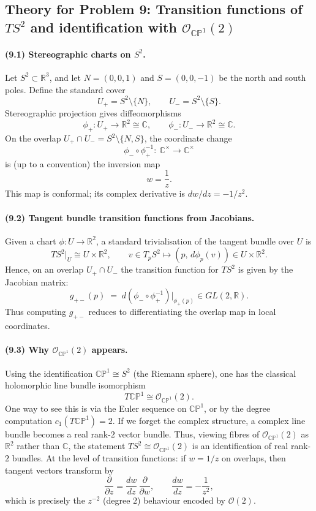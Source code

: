 \documentclass[12pt,a4paper]{article}
\theoremstyle{plain}
\theoremstyle{definition}      %
\begin{document}
\subsection*{Theory for Problem 9: Transition functions of $TS^2$ and identification with $\mathcal{O}_{\mathbb{CP}^1}(2)$}

\paragraph{(9.1) Stereographic charts on $S^2$.}
Let $S^2\subset \mathbb{R}^3$, and let $N=(0,0,1)$ and $S=(0,0,-1)$ be the north and south poles.
Define the standard cover
\[
U_+ = S^2\setminus\{N\},\qquad U_- = S^2\setminus\{S\}.
\]
Stereographic projection gives diffeomorphisms
\[
\phi_+:U_+\to \mathbb{R}^2 \cong \mathbb{C},\qquad
\phi_-:U_-\to \mathbb{R}^2 \cong \mathbb{C}.
\]
On the overlap $U_+\cap U_- = S^2\setminus\{N,S\}$, the coordinate change
\[
\phi_- \circ \phi_+^{-1}:\ \mathbb{C}^\times \longrightarrow \mathbb{C}^\times
\]
is (up to a convention) the inversion map
\[
w = \frac{1}{z}.
\]
This map is conformal; its complex derivative is $dw/dz = -1/z^2$.

\paragraph{(9.2) Tangent bundle transition functions from Jacobians.}
Given a chart $\phi:U\to \mathbb{R}^2$, a standard trivialisation of the tangent bundle over $U$ is
\[
TS^2|_U \cong U\times \mathbb{R}^2,\qquad
v\in T_pS^2 \mapsto (p,\, d\phi_p(v))\in U\times \mathbb{R}^2.
\]
Hence, on an overlap $U_+\cap U_-$ the transition function for $TS^2$ is given by the Jacobian matrix:
\[
g_{+-}(p)\;=\; d(\phi_- \circ \phi_+^{-1})\big|_{\phi_+(p)} \in GL(2,\mathbb{R}).
\]
Thus computing $g_{+-}$ reduces to differentiating the overlap map in local coordinates.

\paragraph{(9.3) Why $\mathcal{O}_{\mathbb{CP}^1}(2)$ appears.}
Using the identification $\mathbb{CP}^1\cong S^2$ (the Riemann sphere), one has the classical
holomorphic line bundle isomorphism
\[
T\mathbb{CP}^1 \cong \mathcal{O}_{\mathbb{CP}^1}(2).
\]
One way to see this is via the Euler sequence on $\mathbb{CP}^1$, or by the degree computation
$c_1(T\mathbb{CP}^1)=2$.
If we forget the complex structure, a complex line bundle becomes a real rank-$2$ vector bundle.
Thus, viewing fibres of $\mathcal{O}_{\mathbb{CP}^1}(2)$ as $\mathbb{R}^2$ rather than $\mathbb{C}$,
the statement $TS^2 \cong \mathcal{O}_{\mathbb{CP}^1}(2)$ is an identification of real rank-$2$ bundles.
At the level of transition functions: if $w=1/z$ on overlaps, then tangent vectors transform by
\[
\frac{\partial}{\partial z} = \frac{dw}{dz}\,\frac{\partial}{\partial w},\qquad \frac{dw}{dz}=-\frac{1}{z^2},
\]
which is precisely the $z^{-2}$ (degree $2$) behaviour encoded by $\mathcal{O}(2)$.
\end{document}
